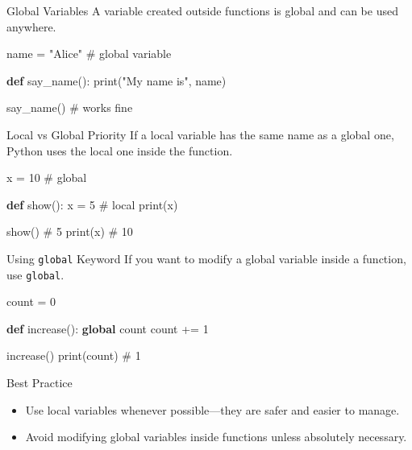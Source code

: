 \documentclass[
  letterpaper,
  DIV=11,
  numbers=noendperiod]{scrreprt}
\newenvironment{Shaded}{\begin{snugshade}}{\end{snugshade}}
\newcommand{\BuiltInTok}[1]{\textcolor[rgb]{0.00,0.23,0.31}{#1}}
\newcommand{\CommentTok}[1]{\textcolor[rgb]{0.37,0.37,0.37}{#1}}
\newcommand{\DecValTok}[1]{\textcolor[rgb]{0.68,0.00,0.00}{#1}}
\newcommand{\KeywordTok}[1]{\textcolor[rgb]{0.00,0.23,0.31}{\textbf{#1}}}
\newcommand{\NormalTok}[1]{\textcolor[rgb]{0.00,0.23,0.31}{#1}}
\newcommand{\OperatorTok}[1]{\textcolor[rgb]{0.37,0.37,0.37}{#1}}
\newcommand{\StringTok}[1]{\textcolor[rgb]{0.13,0.47,0.30}{#1}}
\providecommand{\tightlist}{%
  \setlength{\itemsep}{0pt}\setlength{\parskip}{0pt}}
\begin{document}
Global Variables A variable created outside functions is global and can
be used anywhere.

\begin{Shaded}
\begin{Highlighting}[]
\NormalTok{name }\OperatorTok{=} \StringTok{"Alice"}   \CommentTok{\# global variable}

\KeywordTok{def}\NormalTok{ say\_name():}
    \BuiltInTok{print}\NormalTok{(}\StringTok{"My name is"}\NormalTok{, name)}

\NormalTok{say\_name()       }\CommentTok{\# works fine}
\end{Highlighting}
\end{Shaded}

Local vs Global Priority If a local variable has the same name as a
global one, Python uses the local one inside the function.

\begin{Shaded}
\begin{Highlighting}[]
\NormalTok{x }\OperatorTok{=} \DecValTok{10}   \CommentTok{\# global}

\KeywordTok{def}\NormalTok{ show():}
\NormalTok{    x }\OperatorTok{=} \DecValTok{5}   \CommentTok{\# local}
    \BuiltInTok{print}\NormalTok{(x)}

\NormalTok{show()      }\CommentTok{\# 5}
\BuiltInTok{print}\NormalTok{(x)    }\CommentTok{\# 10}
\end{Highlighting}
\end{Shaded}

Using \texttt{global} Keyword If you want to modify a global variable
inside a function, use \texttt{global}.

\begin{Shaded}
\begin{Highlighting}[]
\NormalTok{count }\OperatorTok{=} \DecValTok{0}

\KeywordTok{def}\NormalTok{ increase():}
    \KeywordTok{global}\NormalTok{ count}
\NormalTok{    count }\OperatorTok{+=} \DecValTok{1}

\NormalTok{increase()}
\BuiltInTok{print}\NormalTok{(count)   }\CommentTok{\# 1}
\end{Highlighting}
\end{Shaded}

Best Practice

\begin{itemize}
\tightlist
\item
  Use local variables whenever possible---they are safer and easier to
  manage.
\item
  Avoid modifying global variables inside functions unless absolutely
  necessary.
\end{itemize}
\end{document}
